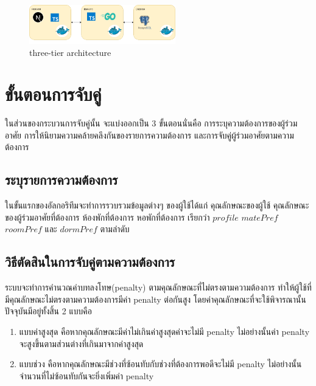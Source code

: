 
\begin{figure}[h]
  \begin{center}
    \includegraphics[width=2.5in]{photo/three-tier.png}
  \end{center}
  \caption{three-tier architecture}
  \label{fig:three-tier}
\end{figure}

\section{ขั้นตอนการจับคู่}
ในส่วนของกระบวนการจับคู่นั้น จะแบ่งออกเป็น 3 ขั้นตอนนั่นคือ การระบุความต้องการของผู้ร่วมอาศัย การให้นิยามความคล้ายคลึงกันของรายการความต้องการ
และการจับคู่ผู้ร่วมอาศัยตามความต้องการ
\subsection{ระบุรายการความต้องการ}
ในขั้นแรกของอัลกอริทึมจะทำการรวบรวมข้อมูลต่างๆ ของผู้ใช้ได้แก่ 
คุณลักษณะของผู้ใช้ คุณลักษณะของผู้ร่วมอาศัยที่ต้องการ ห้องพักที่ต้องการ หอพักที่ต้องการ เรียกว่า $profile$ $matePref$ $roomPref$
และ $dormPref$ ตามลำดับ
\subsection{วิธีตัดสินในการจับคู่ตามความต้องการ}
ระบบจะทำการคำนวณค่าบทลงโทษ(penalty) ตามคุณลักษณะที่ไม่ตรงตามความต้องการ ทำให้ผู้ใช้ที่มีคุณลักษณะไม่ตรงตามความต้องการมีค่า penalty ต่อกันสูง
โดยค่าคุณลักษณะที่จะใช้พิจารณานั้นปัจจุบันมีอยู่ทั้งสิ้น 2 แบบคือ
\begin{enumerate}
  \item แบบค่าสูงสุด คือหากคุณลักษณะมีค่าไม่เกินค่าสูงสุดค่าจะไม่มี penalty ไม่อย่างนั้นค่า penalty จะสูงขึ้นตามส่วนต่างที่เกินมาจากค่าสูงสุด
  \item แบบช่วง คือหากคุณลักษณะมีช่วงที่ซ้อนทับกับช่วงที่ต้องการพอดีจะไม่มี penalty ไม่อย่างนั้นจำนวนที่ไม่ซ้อนทับกันจะยิ่งเพิ่มค่า penalty
\end{enumerate}
